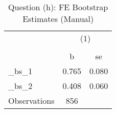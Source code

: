 \begin{table}[htbp]\centering
\def\sym#1{\ifmmode^{#1}\else\(^{#1}\)\fi}
\caption{Question (h): FE Bootstrap Estimates (Manual)}
\begin{tabular}{l*{1}{cc}}
\toprule
                    &\multicolumn{2}{c}{(1)}  \\
                    &\multicolumn{2}{c}{}     \\
                    &           b&          se\\
\midrule
\_bs\_1               &       0.765&       0.080\\
\_bs\_2               &       0.408&       0.060\\
\midrule
Observations        &         856&            \\
\bottomrule
\end{tabular}
\end{table}
